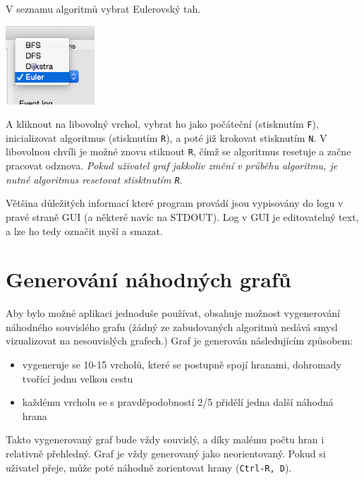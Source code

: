 \documentclass{article}
\def\code#1{\texttt{#1}}
\begin{document}
V seznamu algoritmů vybrat Eulerovský tah.

\vspace{10pt}
\begin{center}
	\includegraphics[width=0.25\textwidth]{ewrHxRO.png}
\end{center}
\vspace{10pt}

A kliknout na libovolný vrchol, vybrat ho jako počáteční (stisknutím \code{F}),
inicializovat algoritmus (stisknutím \code{R}), a poté již krokovat
stisknutím \code{N}. V libovolnou chvíli je možné znovu stiknout \code{R}, čímž se algoritmus
resetuje a začne pracovat odznova. \emph{Pokud uživatel graf jakkoliv změní
v průběhu algoritmu, je nutné algoritmus resetovat stisktnutím \code{R}}.

Většina důležitých informací které program provádí jsou vypisovány do
logu v pravé straně GUI (a některé navíc na STDOUT). Log v GUI je
editovatelný text, a lze ho tedy označit myší a smazat.

\pagebreak

\section{Generování náhodných grafů}

Aby bylo možné aplikaci jednoduše používat, obsahuje možnost
vygenerování náhodného souvislého grafu (žádný ze zabudovaných algoritmů
nedává smysl vizualizovat na nesouvislých grafech.) Graf je generován následujícím způsobem:

\begin{itemize}
  \item vygeneruje se 10-15 vrcholů, které se postupně spojí hranami, dohromady tvořící jednu velkou cestu
  \item každému vrcholu se s pravděpodobností 2/5 přidělí jedna další náhodná hrana
\end{itemize}

Takto vygenerovaný graf bude vždy souvislý, a díky malému počtu hran i
relativně přehledný. Graf je vždy generovaný jako neorientovaný. Pokud
si uživatel přeje, může poté náhodně zorientovat hrany (\code{Ctrl-R, D}).
\end{document}

